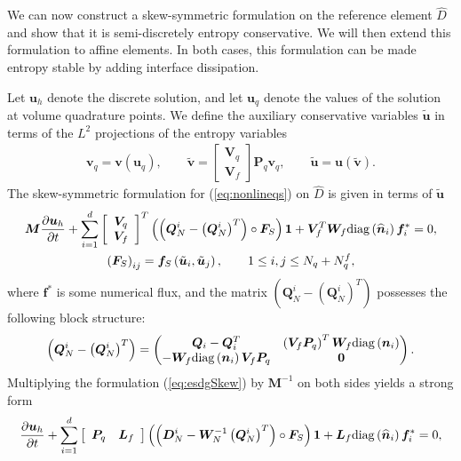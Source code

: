 \documentclass[review]{siamart0216}
\theoremstyle{assumption}
\renewcommand{\hat}[1]{\hat{#1}}
\newcommand{\pd}[2]{\frac{\partial#1}{\partial#2}}
\newcommand{\LRp}[1]{\left( #1 \right)}
\newcommand{\LRs}[1]{\left[ #1 \right]}
\renewcommand{\hat}{\widehat}
\newcommand{\diag}[1]{{\rm diag}\LRp{#1}}
\begin{document}
We can now construct a skew-symmetric formulation on the reference element $\hat{D}$ and show that it is semi-discretely entropy conservative. We will then extend this formulation to affine elements.  In both cases, this formulation can be made entropy stable by adding interface dissipation.  

Let $\bm{u}_h$ denote the discrete solution, and let $\bm{u}_q$ denote the values of the solution at volume quadrature points.  We define the auxiliary conservative variables $\tilde{\bm{u}}$ in terms of the $L^2$ projections of the entropy variables 
\begin{gather}
\bm{v}_q = \bm{v}\LRp{\bm{u}_q}, \qquad \tilde{\bm{v}} = \begin{bmatrix}
\bm{V}_q\\
\bm{V}_f
\end{bmatrix}\bm{P}_q\bm{v}_q, \qquad \tilde{\bm{u}} = \bm{u}\LRp{\tilde{\bm{v}}}.
\end{gather}
The skew-symmetric formulation for (\ref{eq:nonlineqs}) on $\hat{D}$ is given in terms of $\tilde{\bm{u}}$
\begin{gather}
\bm{M}\pd{\bm{u}_h}{t} + \sum_{i=1}^d\LRs{\begin{array}{c}
\bm{V}_q \\ \bm{V}_f\end{array}}^T 
\LRp{\LRp{\bm{Q}^i_N - \LRp{\bm{Q}^i_N}^T} \circ \bm{F}_S}\bm{1} + \bm{V}_f^T\bm{W}_f \diag{\hat{\bm{n}}_i}\bm{f}_i^* = 0,  \label{eq:esdgSkew}\\
\LRp{\bm{F}_S}_{ij} = \bm{f}_S\LRp{\tilde{\bm{u}}_i,\tilde{\bm{u}}_j}, \qquad 1\leq i,j\leq N_q + N^f_q,\nonumber
\end{gather}
where $\bm{f}^*$ is some numerical flux, and the matrix $\LRp{\bm{Q}^i_N - \LRp{\bm{Q}^i_N}^T}$ possesses the following block structure:
\[
\LRp{\bm{Q}^i_N - \LRp{\bm{Q}^i_N}^T} = \begin{pmatrix}
\bm{Q}_i-\bm{Q}_i^T & \LRp{\bm{V}_f \bm{P}_q}^T\bm{W}_f\diag{\bm{n}_i}\\
-\bm{W}_f\diag{\bm{n}_i}{\bm{V}_f \bm{P}_q} & \bm{0}
\end{pmatrix}.
\]
Multiplying the formulation (\ref{eq:esdgSkew}) by $\bm{M}^{-1}$ on both sides yields a strong form 
\begin{gather}
\pd{\bm{u}_h}{t} + \sum_{i=1}^d \LRs{\begin{array}{cc}
\bm{P}_q & \bm{L}_f\end{array}} \LRp{\LRp{\bm{D}^i_N - \bm{W}_N^{-1}\LRp{\bm{Q}^i_N}^T} \circ \bm{F}_S}\bm{1} + \bm{L}_f \diag{\hat{\bm{n}}_i}\bm{f}_i^* = 0,\label{eq:esdg}
\end{gather}
\end{document}
